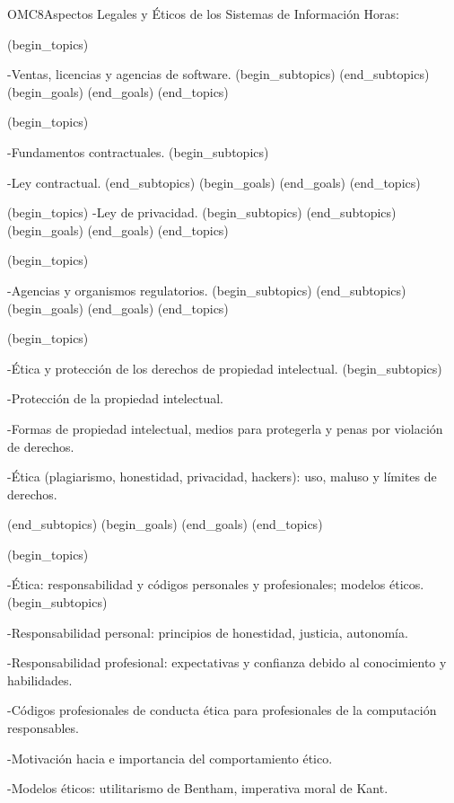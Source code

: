 \begin{BKL2}{OMC8}{Aspectos Legales y Éticos de los Sistemas de Información}
Horas:
 
(begin_topics)

-Ventas, licencias y agencias de software.
(begin_subtopics)
(end_subtopics)
(begin_goals)
(end_goals)
(end_topics)

 

(begin_topics)

-Fundamentos contractuales.
(begin_subtopics)

-Ley contractual.
(end_subtopics)
(begin_goals)
(end_goals)
(end_topics)

 

(begin_topics)
-Ley de privacidad.
(begin_subtopics)
(end_subtopics)
(begin_goals)
(end_goals)
(end_topics)

 

(begin_topics)

-Agencias y organismos regulatorios.
(begin_subtopics)
(end_subtopics)
(begin_goals)
(end_goals)
(end_topics)

 

(begin_topics)

-Ética y protección de los derechos de propiedad intelectual.
(begin_subtopics)

-Protección de la propiedad intelectual.

-Formas de propiedad intelectual, medios para protegerla y penas por violación de derechos.

-Ética (plagiarismo, honestidad, privacidad, hackers): uso, maluso y límites de derechos.

(end_subtopics)
(begin_goals)
(end_goals)
(end_topics)

 

(begin_topics)

-Ética: responsabilidad y códigos personales y profesionales; modelos éticos.
(begin_subtopics)

-Responsabilidad personal: principios de honestidad, justicia, autonomía.

-Responsabilidad profesional: expectativas y confianza debido al conocimiento y habilidades.

-Códigos profesionales de conducta ética para profesionales de la computación responsables.

-Motivación hacia e importancia del comportamiento ético.

-Modelos éticos: utilitarismo de Bentham, imperativa moral de Kant.


\end{BKL2}
